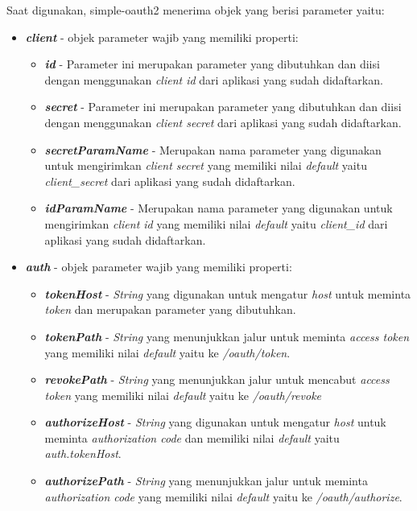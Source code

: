 Saat digunakan, simple-oauth2 menerima objek yang berisi parameter yaitu: 
\begin{itemize}
    \item \textbf{\textit{client}} - objek parameter wajib yang memiliki properti: 
    \begin{itemize}
        \item \textbf{\textit{id}} - Parameter ini merupakan parameter yang dibutuhkan dan diisi dengan menggunakan \textit{client id} dari aplikasi yang sudah didaftarkan. 
        \item \textbf{\textit{secret}} - Parameter ini merupakan parameter yang dibutuhkan dan diisi dengan menggunakan \textit{client secret} dari aplikasi yang sudah didaftarkan. 
        \item \textbf{\textit{secretParamName}} - Merupakan nama parameter yang digunakan untuk mengirimkan \textit{client secret} yang memiliki nilai \textit{default} yaitu \textit{client\_secret} dari aplikasi yang sudah didaftarkan. 
        \item \textbf{\textit{idParamName}} - Merupakan nama parameter yang digunakan untuk mengirimkan \textit{client id} yang memiliki nilai \textit{default} yaitu \textit{client\_id} dari aplikasi yang sudah didaftarkan. 
    \end{itemize}
    \item \textbf{\textit{auth}} - objek parameter wajib yang memiliki properti: 
    \begin{itemize}
        \item \textbf{\textit{tokenHost}} - \textit{String} yang digunakan untuk mengatur \textit{host} untuk meminta \textit{token} dan merupakan parameter yang dibutuhkan.  
        \item \textbf{\textit{tokenPath}} - \textit{String} yang menunjukkan jalur untuk meminta \textit{access token} yang memiliki nilai \textit{default} yaitu ke \textit{/oauth/token}. 
        \item \textbf{\textit{revokePath}} - \textit{String} yang menunjukkan jalur untuk mencabut \textit{access token} yang memiliki nilai \textit{default} yaitu ke \textit{/oauth/revoke}
        \item \textbf{\textit{authorizeHost}} - \textit{String} yang digunakan untuk mengatur \textit{host} untuk meminta \textit{authorization code} dan memiliki nilai \textit{default} yaitu \textit{auth.tokenHost}. 
        \item \textbf{\textit{authorizePath}} - \textit{String} yang menunjukkan jalur untuk meminta \textit{authorization code} yang memiliki nilai \textit{default} yaitu ke \textit{/oauth/authorize}. 

\end{itemize}
\end{itemize}
